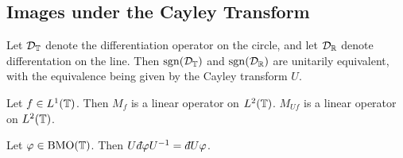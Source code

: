 \subsection{Images under the Cayley Transform}

\begin{proposition}
    Let $\mathcal{D}_{\mathbb{T}}$ denote the differentiation operator on the circle,
    and let $\mathcal{D}_{\mathbb{R}}$ denote differentation on the line. Then $\operatorname{sgn}(\mathcal{D}_{\mathbb{T}})$
    and $\operatorname{sgn}(\mathcal{D}_{\mathbb{R}})$ are unitarily equivalent, with the equivalence being
    given by the Cayley transform $U$.
\end{proposition}

\begin{remark}
    Let $f \in L^1(\mathbb{T})$. Then $M_f$ is a
    linear operator on $L^2(\mathbb{T})$. $M_{Uf}$ is a linear operator on
    $L^2(\mathbb{T})$.
\end{remark}

\begin{proposition}
    Let $\varphi \in \operatorname{BMO}(\mathbb{T})$. Then $U\qd \varphi U^{-1} = \qd U\varphi$.
\end{proposition}

